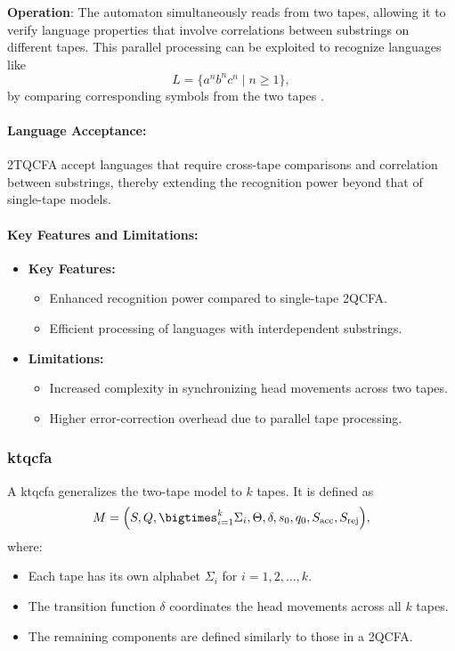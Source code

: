 \textbf{Operation}:  
The automaton simultaneously reads from two tapes, allowing it to verify language properties that involve correlations between substrings on different tapes. This parallel processing can be exploited to recognize languages like 
\[
L = \{a^n b^n c^n \mid n \geq 1\},
\]
by comparing corresponding symbols from the two tapes \cite{zheng2012two}.

\paragraph{Language Acceptance:}  
2TQCFA accept languages that require cross-tape comparisons and correlation between substrings, thereby extending the recognition power beyond that of single-tape models.

\paragraph{Key Features and Limitations:}
\begin{itemize}
    \item \textbf{Key Features:}
    \begin{itemize}
        \item Enhanced recognition power compared to single-tape 2QCFA.
        \item Efficient processing of languages with interdependent substrings.
    \end{itemize}
    \item \textbf{Limitations:}
    \begin{itemize}
        \item Increased complexity in synchronizing head movements across two tapes.
        \item Higher error-correction overhead due to parallel tape processing.
    \end{itemize}
\end{itemize}

\subsubsection{\gls{ktqcfa}}
\label{sssec:ktqcfa}
\begin{definition}
A \gls{ktqcfa} generalizes the two-tape model to \( k \) tapes. It is defined as 
\[
M = \Bigl(S, Q, \bigtimes_{i=1}^{k} \Sigma_i, \Theta, \delta, s_0, q_0, S_{\text{acc}}, S_{\text{rej}}\Bigr),
\]
where:
\begin{itemize}
    \item Each tape has its own alphabet \( \Sigma_i \) for \( i = 1, 2, \ldots, k \).
    \item The transition function \(\delta\) coordinates the head movements across all \( k \) tapes.
    \item The remaining components are defined similarly to those in a 2QCFA.
\end{itemize}
\end{definition}

